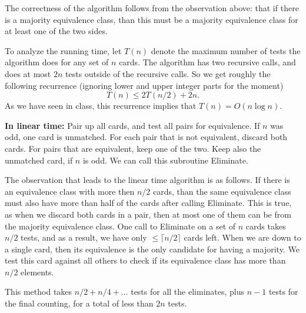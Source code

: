 \documentclass[12pt]{article}
\newcommand{\Xomit}[1]{}
\newcommand{\proof}[1]{
{\noindent {\it Proof.} {#1} \rule{2mm}{2mm} \vskip \belowdisplayskip}
}
\begin{document}
\begin{enumerate}
{The correctness of the algorithm follows from the observation 
above: that if there is a majority equivalence class, than this
must be a majority equivalence class for at least one of the two
sides. 

To analyze the running time, let $T(n)$ denote the maximum number of
tests the algorithm does for any set of $n$ cards. The algorithm
has two recursive calls, and does at most $2n$ tests outside of the 
recursive calls. So we get roughly the following recurrence
(ignoring lower and
upper integer parts for the moment)
\[T(n) \le 2 T(n/2) +2n.\]
As we have seen in class, this recurrence implies
that $T(n) = O(n \log n)$.

\Xomit{
\begin{itemize}
{\em $T(n) \le 2 n\lceil \log_2 n\rceil$.}
The solution of such a recurrence is $O(n\log n)$ as it is shown below.
\end{itemize}
\proof{We prove this statement by induction on the size $n$ of
$S$. When $n=2$ we do one test, so the statement is true.

Let $k=\lceil \log_2 n\rceil$. We need to prove that the number of 
tests is at most $2nk$. Assume that $S_i$ has size $n_i$. 
Note that $\lceil \log_2 n_i\rceil \le k-1$ for both $i=1,2$. 
By the induction hypothesis the two recursive calls do at 
most $n_i (k-1)$ tests each, and the total number of tests is
at most 
\[2n_1(k-1)+ 2n_2(k-1) +2n =le 2nk.\]
}
}

\vskip 0.2in
\noindent
{\bf  In linear time:}
Pair up all cards, and test all pairs for equivalence. If $n$
was odd, one card is unmatched. For each pair that is not 
equivalent, discard both cards. For pairs that are equivalent, keep one of the
two. Keep also the unmatched card, if $n$ is odd. We can call this 
subroutine {\sc Eliminate}.

The observation that leads to the linear time algorithm is as follows. If there 
is an equivalence class with more then $n/2$ cards, than the same 
equivalence class must also have more than half of the cards after 
calling {\sc Eliminate}. This is true, as when we discard both cards in 
a pair, then at most one of them can be from the majority equivalence class. 
One call to {\sc Eliminate} on a set of $n$ cards takes $n/2$ tests, and
as a result, we have only $\le \lceil n/2 \rceil$ cards left. When we are down 
to a single card, then its equivalence is the only candidate for having a
majority. We test this card against all others to check if its equivalence
class has more than $n/2$ elements.

This method takes $n/2+n/4+\ldots$ tests for all the eliminates, plus $n-1$
tests for the final counting, for a total of less than $2n$ tests.


}

\end{enumerate}
\end{document}
